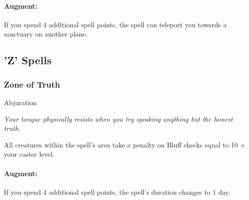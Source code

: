 \paragraph{Augment:} If you spend 4 additional spell points, the spell can teleport you towards a sanctuary on another plane.


\subsection{'Z' Spells}
\subsubsection{Zone of Truth}
\label{Spell:ZoneOfTruth}
Abjuration
\Range{\CloseRange}
\Duration{\TenMinLevelDuration{\DismissibleSpell}}
\SRno
{}

\emph{Your tongue physically resists when you try speaking anything but the honest truth.}

All creatures within the spell's area take a penalty on Bluff checks equal to 10 + your caster level.

\paragraph{Augment:} If you spend 4 additional spell points, the spell's duration changes to 1 day.


